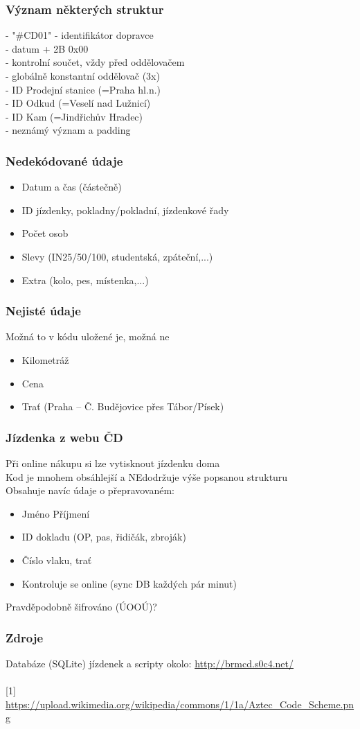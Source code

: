 \documentclass{beamer}
\begin{document}
\begin{frame}
	\frametitle{Význam některých struktur}
	\texttt{\color{red}{2343443031}} \color{black} - "\#CD01" - identifikátor dopravce\\
	\texttt{\color{cyan}{9A040000}} \color{black} - datum + 2B 0x00\\
	\texttt{\color{orange}{C381}} \color{black} - kontrolní součet, vždy před oddělovačem\\
	\texttt{\color{blue}{C3A440}} \color{black} - globálně konstantní oddělovač (3x)\\
	\texttt{\color{green}{C2B44453}} \color{black} - ID Prodejní stanice (=Praha hl.n.)\\
	\texttt{\color{magenta}{10C28553}} \color{black} - ID Odkud (=Veselí nad Lužnicí)\\
	\texttt{\color{olive}{3AC28853}} \color{black} - ID Kam (=Jindřichův Hradec)\\
	\texttt{\color{black}{XXXXXXXX}} - neznámý význam a padding
\end{frame}

\begin{frame}
	\frametitle{Nedekódované údaje}
	\begin{itemize}
		\item Datum a čas (částečně)
		\item ID jízdenky, pokladny/pokladní, jízdenkové řady
		\item Počet osob
		\item Slevy (IN25/50/100, studentská, zpáteční,...)
		\item Extra (kolo, pes, místenka,...)
	\end{itemize}
\end{frame}

\begin{frame}
	\frametitle{Nejisté údaje}
	\color{black}
	Možná to v kódu uložené je, možná ne
	\begin{itemize}
		\item Kilometráž
		\item Cena
		\item Trať (Praha -- Č. Budějovice přes Tábor/Písek)
	\end{itemize}
\end{frame}

\begin{frame}
	\frametitle{Jízdenka z webu ČD}
	\color{black}
	Při online nákupu si lze vytisknout jízdenku doma\\
	Kod je mnohem obsáhlejší a NEdodržuje výše popsanou strukturu\\
	Obsahuje navíc údaje o přepravovaném:
	\begin{itemize}
		\item Jméno Příjmení
		\item ID dokladu (OP, pas, řidičák, zbroják)
		\item Číslo vlaku, trať
		\item Kontroluje se online (sync DB každých pár minut)
	\end{itemize}
	Pravděpodobně šifrováno (ÚOOÚ)?
\end{frame}

\begin{frame}
	\frametitle{Zdroje}
	\color{black}
	Databáze (SQLite) jízdenek a scripty okolo: \url{http://brmcd.s0c4.net/}\\
	\texttt{\ }\\
	\tiny{[1] \url{https://upload.wikimedia.org/wikipedia/commons/1/1a/Aztec_Code_Scheme.png}}
\end{frame}
\end{document}
